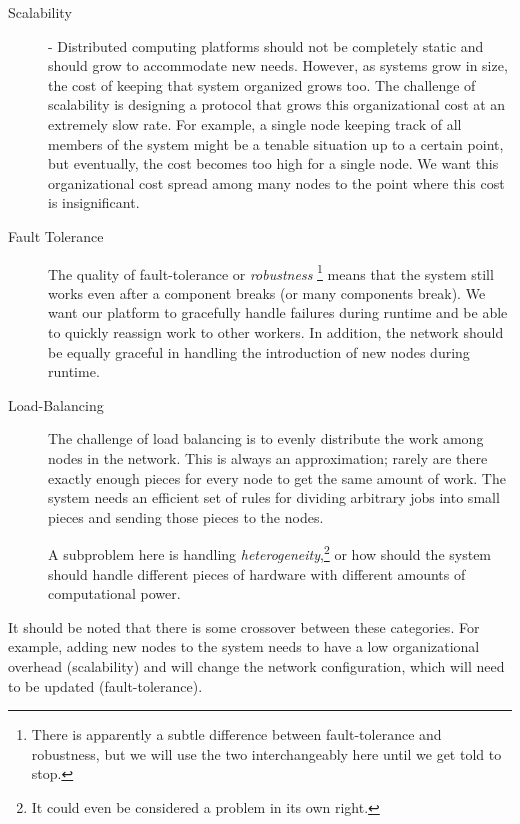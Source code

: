 \begin{description}
	\item[Scalability] - Distributed computing platforms should not be completely static and should grow to accommodate new needs.
	However, as systems grow in size, the cost of keeping that system organized grows too.
	The challenge of scalability is designing a protocol that grows this organizational cost at an extremely slow rate.
	For example, a single node keeping track of all members of the system might be a tenable situation up to a certain point, but eventually, the cost becomes too high for a single node.
	We want this organizational cost spread among many nodes to the point where this cost is insignificant. %
	\item[Fault Tolerance]  
	The quality of fault-tolerance or \textit{robustness} \footnote{There is apparently a subtle difference between fault-tolerance and robustness, but we will use the two interchangeably here until we get told to stop.} means that the system still works even after a component breaks (or many components break).
	We want our platform to gracefully handle failures during runtime and be able to quickly reassign work to other workers.
	In addition, the network should be equally graceful in handling the introduction of new nodes during runtime.
	
	\item[Load-Balancing]
	The challenge of load balancing is to evenly distribute the work among nodes in the network.
	This is always an approximation; rarely  are there exactly enough pieces for  every node to get the same amount of work.
	The system needs an efficient set of rules for dividing arbitrary jobs into small pieces and sending those pieces to the nodes.
	
	A subproblem here is handling \textit{heterogeneity},\footnote{It could even be considered a problem in its own right.} or how should the system should handle different pieces of hardware with different amounts of computational power.
	
	
\end{description}
It should be noted that there is some crossover between these categories. 
For example, adding new nodes to the system needs to have a low organizational overhead (scalability) and will change the network configuration, which will need to be updated (fault-tolerance).




